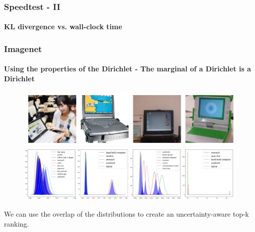 \documentclass[10pt,usepdftitle=false,aspectratio=169,handout]{beamer}
\begin{document}

\begin{frame}\frametitle{Speedtest - II}
	\framesubtitle{KL divergence vs. wall-clock time}
	\begin{figure}
		
	\end{figure}
\end{frame}


\setlength{\figwidth}{0.95\textwidth}
\setlength{\figheight}{0.34\textheight}

\begin{frame}\frametitle{Imagenet}
	\framesubtitle{Using the properties of the Dirichlet - The marginal of a Dirichlet is a Dirichlet}
	\begin{figure}
		\centering
		\includegraphics[width=\figwidth,height=\figheight]{../figures/imagenet_images.pdf} \\
		\includegraphics[width=\figwidth,height=\figheight]{../figures/imagenet_marginal_betas.pdf}
	\end{figure}
	We can use the overlap of the distributions to create an uncertainty-aware top-k ranking.
\end{frame}


\setlength{\figwidth}{0.95\textwidth}
\setlength{\figheight}{0.6\textheight}
\end{document}
